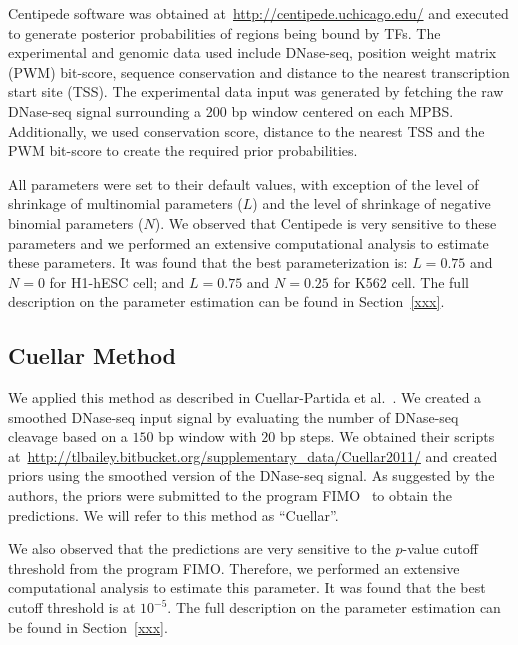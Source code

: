 Centipede software was obtained at~\url{http://centipede.uchicago.edu/} and executed to generate posterior probabilities of regions being bound by TFs. The experimental and genomic data used include DNase-seq, position weight matrix (PWM) bit-score, sequence conservation and distance to the nearest transcription start site (TSS). The experimental data input was generated by fetching the raw DNase-seq signal surrounding a 200 bp window centered on each MPBS. Additionally, we used conservation score, distance to the nearest TSS and the PWM bit-score to create the required prior probabilities.

All parameters were set to their default values, with exception of the level of shrinkage of multinomial parameters ($L$) and the level of shrinkage of negative binomial parameters ($N$). We observed that Centipede is very sensitive to these parameters and we performed an extensive computational analysis to estimate these parameters. It was found that the best parameterization is: $L=0.75$ and $N=0$ for H1-hESC cell; and $L=0.75$ and $N=0.25$ for K562 cell. The full description on the parameter estimation can be found in Section~\ref{xxx}.

\subsection{Cuellar Method}
\label{sec:cuellar}

We applied this method as described in Cuellar-Partida et al.~\cite{cuellar2012}. We created a smoothed DNase-seq input signal by evaluating the number of DNase-seq cleavage based on a $150$ bp window with $20$ bp steps. We obtained their scripts at~\url{http://tlbailey.bitbucket.org/supplementary_data/Cuellar2011/} and created priors using the smoothed version of the DNase-seq signal. As suggested by the authors, the priors were submitted to the program FIMO~\cite{grant2011} to obtain the predictions. We will refer to this method as ``Cuellar''.

We also observed that the predictions are very sensitive to the $p$-value cutoff threshold from the program FIMO. Therefore, we performed an extensive computational analysis to estimate this parameter. It was found that the best cutoff threshold is at $10^{-5}$. The full description on the parameter estimation can be found in Section~\ref{xxx}.

